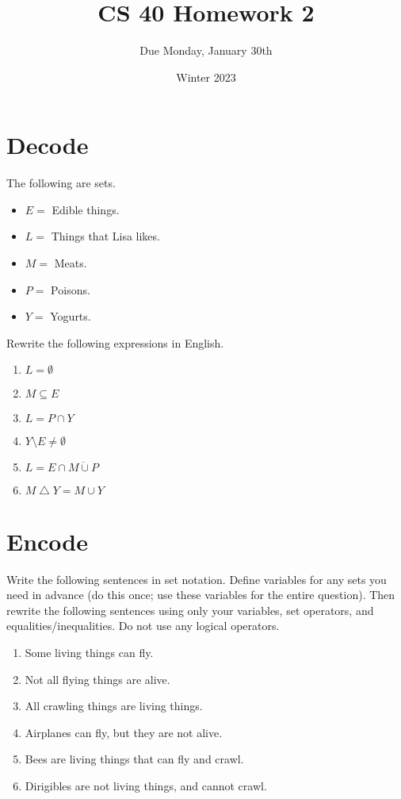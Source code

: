 \documentclass{article}
\title{CS 40 Homework 2}
\author{Due Monday, January 30th}
\date{Winter 2023}
\begin{document}
\maketitle

\section{Decode}

The following are sets.

\begin{itemize}
    \setlength{\itemsep}{0pt}
    \item $E = $ Edible things.
    \item $L = $ Things that Lisa likes.
    \item $M = $ Meats.
    \item $P = $ Poisons.
    \item $Y = $ Yogurts.
\end{itemize}

\noindent
Rewrite the following expressions in English.

\begin{enumerate}[label=\textbf{\alph*.}]
    \setlength{\itemsep}{0pt}
    \item $L = \emptyset$
    \item $M \subseteq E$
    \item $L = P \cap Y$
    \item $Y \setminus E \neq \emptyset$
    \item $L = E \cap \overline{M \cup P}$
    \item $M \bigtriangleup Y = M \cup Y$
\end{enumerate}


\section{Encode}

Write the following sentences in set notation.
Define variables for any sets you need in advance (do this once; use these variables for the entire question).
Then rewrite the following sentences using only your variables, set operators, and equalities/inequalities.
Do not use any logical operators.

\begin{enumerate}[label=\textbf{\alph*.}]
    \setlength{\itemsep}{0pt}
    \item Some living things can fly.
    \item Not all flying things are alive.
    \item All crawling things are living things.
    \item Airplanes can fly, but they are not alive.
    \item Bees are living things that can fly and crawl.
    \item Dirigibles are not living things, and cannot crawl.
\end{enumerate}
\end{document}
